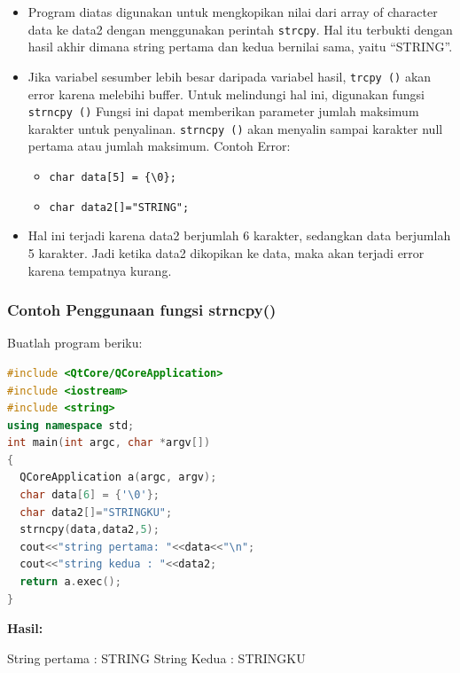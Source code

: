 \begin{itemize}
\item
  Program diatas digunakan untuk mengkopikan nilai dari array of
  character data ke data2 dengan menggunakan perintah \texttt{strcpy}.
  Hal itu terbukti dengan hasil akhir dimana string pertama dan kedua
  bernilai sama, yaitu ``STRING''.
\item
  Jika variabel sesumber lebih besar daripada variabel hasil,
  \texttt{trcpy\ ()} akan error karena melebihi buffer. Untuk melindungi
  hal ini, digunakan fungsi \texttt{strncpy\ ()} Fungsi ini dapat
  memberikan parameter jumlah maksimum karakter untuk penyalinan.
  \texttt{strncpy\ ()} akan menyalin sampai karakter null pertama atau
  jumlah maksimum. Contoh Error:

  \begin{itemize}
  
  \item
    \texttt{char\ data{[}5{]}\ =\ \{\textquotesingle{}\textbackslash{}0\textquotesingle{}\};}
  \item
    \texttt{char\ data2{[}{]}="STRING";}
  \end{itemize}
\item
  Hal ini terjadi karena data2 berjumlah 6 karakter, sedangkan data
  berjumlah 5 karakter. Jadi ketika data2 dikopikan ke data, maka akan
  terjadi error karena tempatnya kurang.
\end{itemize}

\subsubsection*{Contoh  Penggunaan fungsi strncpy()}

Buatlah program beriku:

\begin{lstlisting}[language=c++, caption=Penggunaan fungsi strncpy(), label=contoh3-21]
#include <QtCore/QCoreApplication>
#include <iostream>
#include <string>
using namespace std;
int main(int argc, char *argv[])
{
  QCoreApplication a(argc, argv);
  char data[6] = {'\0'};
  char data2[]="STRINGKU";
  strncpy(data,data2,5);
  cout<<"string pertama: "<<data<<"\n";
  cout<<"string kedua : "<<data2;
  return a.exec();
}
\end{lstlisting}

\textbf{Hasil:}
\begin{lcverbatim}
 String pertama : STRING
 String Kedua : STRINGKU
\end{lcverbatim}


